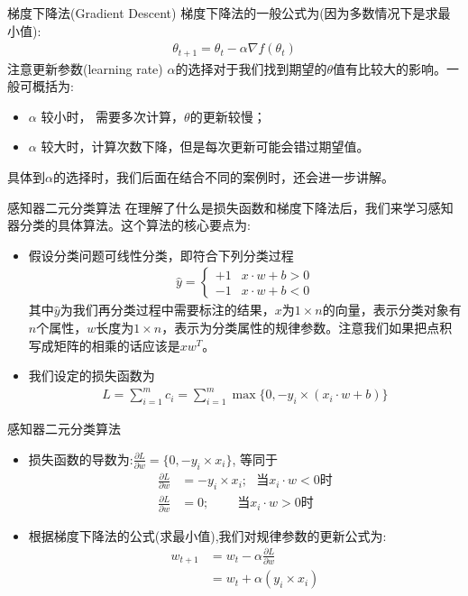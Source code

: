 \documentclass[handout]{ctexbeamer}
\begin{document}
\begin{frame}{梯度下降法(Gradient Descent)}
梯度下降法的一般公式为(因为多数情况下是求最小值): 
\begin{align*}
		\theta_{t+1} = \theta_t - \alpha \nabla f(\theta_t)
	\end{align*}
注意更新参数(learning rate) $\alpha$的选择对于我们找到期望的$\theta$值有比较大的影响。一般可概括为:
\begin{itemize}
	\item $\alpha$ 较小时， 需要多次计算，$\theta$的更新较慢；
	\item $\alpha$ 较大时，计算次数下降，但是每次更新可能会错过期望值。
\end{itemize}
具体到$\alpha$的选择时，我们后面在结合不同的案例时，还会进一步讲解。	
\end{frame}


\begin{frame}{感知器二元分类算法}
在理解了什么是损失函数和梯度下降法后，我们来学习感知器分类的具体算法。这个算法的核心要点为:
	\begin{itemize}
		\item 假设分类问题可线性分类，即符合下列分类过程 \begin{align*}
		\hat{y} = \begin{cases}
			+1 & x \cdot w + b > 0 \\
			-1 & x \cdot w  + b < 0
		\end{cases}
	\end{align*}
	其中$\hat{y}$为我们再分类过程中需要标注的结果，$x$为$1\times n$的向量，表示分类对象有$n$个属性，$w$长度为$1 \times n$，表示为分类属性的规律参数。注意我们如果把点积写成矩阵的相乘的话应该是$x w^T$。
	\item 我们设定的损失函数为 \begin{align*}
		L = \sum_{i=1}^m c_i = \sum_{i=1}^m \max \{ 0, - y_i \times (x_i \cdot w + b) \} 
	\end{align*}
	\end{itemize}
\end{frame}

\begin{frame}{感知器二元分类算法}
	\begin{itemize}
		\item  损失函数的导数为:$\frac{\partial L}{\partial w} = \{ 0, -y_i \times x_i \}$, 等同于
	\begin{align*}
		\frac{\partial L}{\partial w} & = - y_i \times x_i; \ \ \ \text{当$x_i \cdot w < 0$时} \\
		\frac{\partial L}{\partial w} & = 0; \ \ \ \ \ \ \ \ \ \ \text{当$x_i \cdot w > 0$时}
	\end{align*}
	\item 根据梯度下降法的公式(求最小值),我们对规律参数的更新公式为: \begin{align*}
		w_{t+1} & = w_{t} - \alpha \frac{\partial L}{\partial w} \\
		& = w_{t} + \alpha (y_i \times x_i) \tag{当$x_i \cdot w < 0$}
	\end{align*}
	\end{itemize}
\end{frame}
\end{document}
